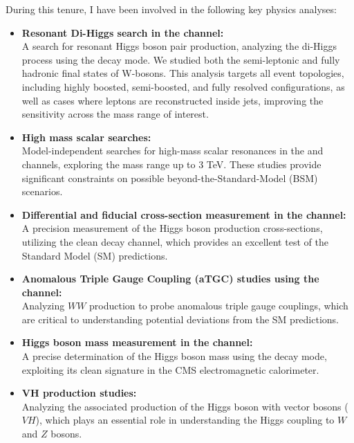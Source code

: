 During this tenure, I have been involved in the following key physics analyses:
\begin{itemize}
    \item \textbf{Resonant Di-Higgs search in the \HHWW channel:} \\
    A search for resonant Higgs boson pair production, analyzing the di-Higgs process using the
    \HHWW decay mode.
    We studied both the semi-leptonic and fully hadronic final states of W-bosons.
    This analysis targets all event topologies, including highly boosted, semi-boosted,
    and fully resolved configurations, as well as cases where leptons are reconstructed inside jets,
    improving the sensitivity across the mass range of interest.

    \item \textbf{High mass scalar searches:} \\
    Model-independent searches for high-mass scalar resonances in the \XZZ and \XZZv channels,
    exploring the mass range up to 3 TeV.
    These studies provide significant constraints on possible beyond-the-Standard-Model (BSM) scenarios.

    \item \textbf{Differential and fiducial cross-section measurement in the \HToFourL channel:} \\
    A precision measurement of the Higgs boson production cross-sections, utilizing the clean \HToFourL
    decay channel, which provides an excellent test of the Standard Model (SM) predictions.

    \item \textbf{Anomalous Triple Gauge Coupling (aTGC) studies using the \WpWm channel:} \\
    Analyzing $WW$ production to probe anomalous triple gauge couplings,
    which are critical to understanding potential deviations from the SM predictions.

    \item \textbf{Higgs boson mass measurement in the \HGG channel:} \\
    A precise determination of the Higgs boson mass using the \HGG decay mode,
    exploiting its clean signature in the CMS electromagnetic calorimeter.

    \item \textbf{VH production studies:} \\
    Analyzing the associated production of the Higgs boson with vector bosons ($VH$),
    which plays an essential role in understanding the Higgs coupling to $W$ and $Z$ bosons.


\end{itemize}
